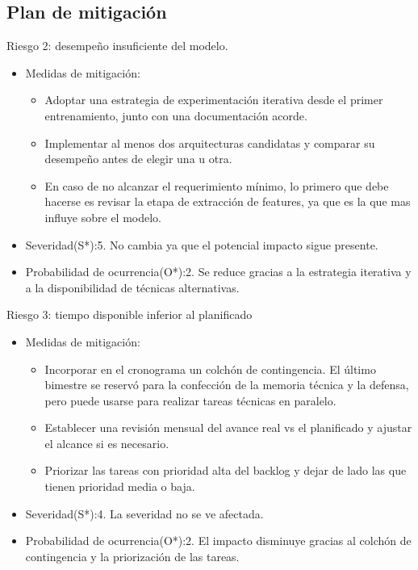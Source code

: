 \documentclass[
11pt, %
]{charter}
\begin{document}
\subsection{Plan de mitigación}

Riesgo 2: desempeño insuficiente del modelo. 
\begin{itemize}
  \item Medidas de mitigación: 
    \begin{itemize}
      \item Adoptar una estrategia de experimentación iterativa desde el primer entrenamiento, junto con una documentación acorde.
      \item Implementar al menos dos arquitecturas candidatas y comparar su desempeño antes de elegir una u otra.
      \item En caso de no alcanzar el requerimiento mínimo, lo primero que debe hacerse es revisar la etapa de extracción de features, ya que
      es la que mas influye sobre el modelo.
    \end{itemize}
  \item Severidad(S*):5. No cambia ya que el potencial impacto sigue presente.
  \item Probabilidad de ocurrencia(O*):2. Se reduce gracias a la estrategia iterativa y a la disponibilidad de técnicas alternativas.
\end{itemize}

Riesgo 3: tiempo disponible inferior al planificado
\begin{itemize}
  \item Medidas de mitigación:
    \begin{itemize}
      \item Incorporar en el cronograma un colchón de contingencia. El último bimestre se reservó para la confección de la memoria técnica y la defensa,
      pero puede usarse para realizar tareas técnicas en paralelo.
      \item Establecer una revisión mensual del avance real vs el planificado y ajustar el alcance si es necesario.
      \item Priorizar las tareas con prioridad alta del backlog y dejar de lado las que tienen prioridad media o baja.
    \end{itemize}
  \item Severidad(S*):4. La severidad no se ve afectada.
  \item Probabilidad de ocurrencia(O*):2. El impacto disminuye gracias al colchón de contingencia y la priorización de las tareas.
\end{itemize}
\end{document}
